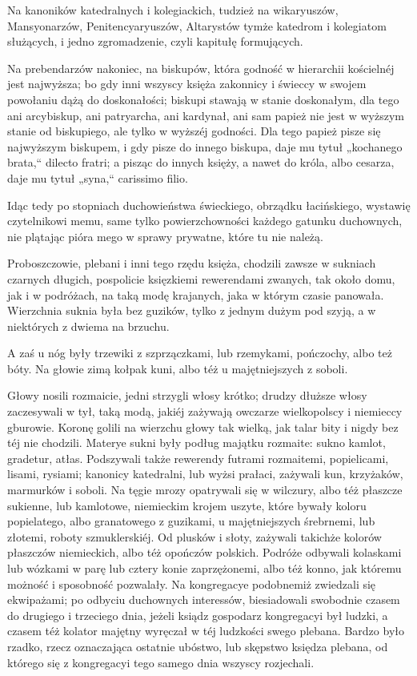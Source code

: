 \documentclass{book}
\begin{document}
Na kanoników katedralnych i kolegiackich, tudzież na wikaryuszów, Mansyonarzów, Penitencyaryuszów, Altarystów tymże katedrom i kolegiatom służących, i jedno zgromadzenie, czyli kapitułę formujących.

Na prebendarzów nakoniec, na biskupów, która godność w hierarchii kościelnéj jest najwyższa; bo gdy inni wszyscy księża zakonnicy i świeccy w swojem powołaniu dążą do doskonałości; biskupi stawają w stanie doskonałym, dla tego ani arcybiskup, ani patryarcha, ani kardynał, ani sam papież nie jest w wyższym stanie od biskupiego, ale tylko w wyższéj godności. Dla tego papież pisze się najwyższym biskupem, i gdy pisze do innego biskupa, daje mu tytuł „kochanego brata,“ dilecto fratri; a pisząc do innych księży, a nawet do króla, albo cesarza, daje mu tytuł „syna,“ carissimo filio.

Idąc tedy po stopniach duchowieństwa świeckiego, obrządku łacińskiego, wystawię czytelnikowi memu, same tylko powierzchowności każdego gatunku duchownych, nie plątając pióra mego w sprawy prywatne, które tu nie należą.

Proboszczowie, plebani i inni tego rzędu księża, chodzili zawsze w sukniach czarnych długich, pospolicie księzkiemi rewerendami zwanych, tak około domu, jak i w podróżach, na taką modę krajanych, jaka w którym czasie panowała. Wierzchnia suknia była bez guzików, tylko z jednym dużym pod szyją, a w niektórych z dwiema na brzuchu.

A zaś u nóg były trzewiki z szprzączkami, lub rzemykami, pończochy, albo też bóty. Na głowie zimą kołpak kuni, albo téż u majętniejszych z soboli.

Głowy nosili rozmaicie, jedni strzygli włosy krótko; drudzy dłuższe włosy zaczesywali w tył, taką modą, jakiéj zażywają owczarze wielkopolscy i niemieccy gburowie. Koronę golili na wierzchu głowy tak wielką, jak talar bity i nigdy bez téj nie chodzili. Materye sukni były podług majątku rozmaite: sukno kamlot, gradetur, atłas. Podszywali także rewerendy futrami rozmaitemi, popielicami, lisami, rysiami; kanonicy katedralni, lub wyżsi prałaci, zażywali kun, krzyżaków, marmurków i soboli. Na tęgie mrozy opatrywali się w wilczury, albo téż płaszcze sukienne, lub kamlotowe, niemieckim krojem uszyte, które bywały koloru popielatego, albo granatowego z guzikami, u majętniejszych śrebrnemi, lub złotemi, roboty szmuklerskiéj. Od plusków i słoty, zażywali takichże kolorów płaszczów niemieckich, albo téż opończów polskich. Podróże odbywali kolaskami lub wózkami w parę lub cztery konie zaprzężonemi, albo téż konno, jak któremu możność i sposobność pozwalały. Na kongregacye podobnemiż zwiedzali się ekwipażami; po odbyciu duchownych interessów, biesiadowali swobodnie czasem do drugiego i trzeciego dnia, jeżeli ksiądz gospodarz kongregacyi był ludzki, a czasem téż kolator majętny wyręczał w téj ludzkości swego plebana. Bardzo było rzadko, rzecz oznaczająca ostatnie ubóstwo, lub skępstwo księdza plebana, od którego się z kongregacyi tego samego dnia wszyscy rozjechali.
\end{document}
